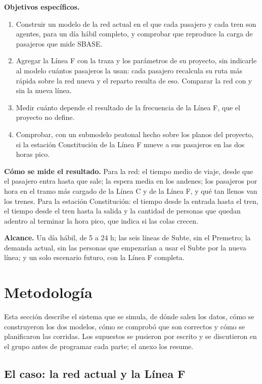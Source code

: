 \documentclass{article}
\begin{document}
\textbf{Objetivos específicos.}
\begin{enumerate}
  \item Construir un modelo de la red actual en el que cada pasajero y cada tren son agentes, para un día hábil
    completo, y comprobar que reproduce la carga de pasajeros que mide SBASE.
  \item Agregar la Línea F con la traza y los parámetros de su proyecto, sin indicarle al modelo cuántos
    pasajeros la usan: cada pasajero recalcula su ruta más rápida sobre la red nueva y el reparto resulta de
    eso. Comparar la red con y sin la nueva línea.
  \item Medir cuánto depende el resultado de la frecuencia de la Línea F, que el proyecto no define.
  \item Comprobar, con un submodelo peatonal hecho sobre los planos del proyecto, si la estación Constitución
    de la Línea F mueve a sus pasajeros en las dos horas pico.
\end{enumerate}

\textbf{Cómo se mide el resultado.} Para la red: el tiempo medio de viaje, desde que el pasajero entra hasta
que sale; la espera media en los andenes; los pasajeros por hora en el tramo más cargado de la Línea C y de la
Línea F, y qué tan llenos van los trenes. Para la estación Constitución: el tiempo desde la entrada hasta el
tren, el tiempo desde el tren hasta la salida y la cantidad de personas que quedan adentro al terminar la
hora pico, que indica si las colas crecen.

\textbf{Alcance.} Un día hábil, de 5 a 24 h; las seis líneas de Subte, sin el Premetro; la demanda actual,
sin las personas que empezarían a usar el Subte por la nueva línea; y un solo escenario futuro, con la Línea F
completa.

\section{Metodología}
\label{sec:metodologia}

Esta sección describe el sistema que se simula, de dónde salen los datos, cómo se construyeron los dos
modelos, cómo se comprobó que son correctos y cómo se planificaron las corridas. Los supuestos se pusieron
por escrito y se discutieron en el grupo antes de programar cada parte; el anexo los resume.

\subsection{El caso: la red actual y la Línea F}
\label{sec:caso}
\end{document}
